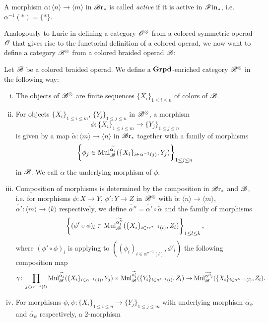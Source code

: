 \begin{defin}
    A morphism $\alpha \colon \langle n \rangle \to \langle m \rangle$ in $\mathscr{B} \text{r}_{\ast}$
    is called \emph{active} if it is active in $\mathscr{F} \text{in}_{\ast}$, i.e. $\alpha^{-1}(\ast) =
    \{\ast\}$.
\end{defin}

Analogously to Lurie in \cite{ha} defining a category $\mathscr{O}^{\otimes}$ from a colored
symmetric operad $\mathscr{O}$ that gives rise to the functorial definition of a colored
operad, we now want to define a category $\mathscr{B}^{\otimes}$ from a colored braided operad
$\mathscr{B}$:

\begin{defin}\label{def:B-tensor} Let $\mathscr{B}$ be a colored braided operad. We
    define a $\operatorname{\textbf{Grpd}}$-enriched category $\mathscr{B}^{\otimes}$ in the following way:
    \begin{enumerate}[(i)]
        \item The objects of $\mathscr{B}^{\otimes}$ are finite sequences $\{X_i\}_{1 \leq i \leq
        n}$ of colors of $\mathscr{B}$.
        \item For objects $\{X_i\}_{1 \leq i \leq m}$, $\{Y_j\}_{1 \leq j \leq
        n}$ in $\mathscr{B}^{\otimes}$, a morphism 
        \[
            \phi \colon \{X_i\}_{1 \leq i \leq m} \to \{Y_j\}_{1 \leq j \leq n}
        \]
        is given by a map $\widetilde{\alpha} \colon \langle m \rangle \to
        \langle n \rangle$ in $\mathscr{B} \text{r}_{\ast}$ together with a family of morphisms
        \[
            \left\{ \phi_j \in \operatorname{Mul}_{\mathscr{B}}^{\widetilde{\alpha_j}}(\{X_i\}_{i \in \alpha^{-1}(j)}, Y_j)\right\}_{1 \leq j \leq n}
        \]
        in $\mathscr{B}$. We call $\widetilde{\alpha}$ the underlying morphism of $\phi$.
        \item Composition of morphisms is determined by the composition in
        $\mathscr{B} \text{r}_{\ast}$ and $\mathscr{B}$, i.e. for morphisms $\phi \colon X \to Y$, $\phi' \colon
        Y \to Z$ in $\mathscr{B}^{\otimes}$  with $\widetilde{\alpha} \colon \langle n \rangle \to
        \langle m \rangle$, $\widetilde{\alpha'} \colon \langle m \rangle \to
        \langle k \rangle$ respectively, we define $\widetilde{\alpha''} =
        \widetilde{\alpha'} \circ \widetilde{\alpha}$ and the family of
        morphisms
        \[
            \left\{(\phi' \circ \phi)_l \in  \operatorname{Mul}_{\mathscr{B}}^{\widetilde{\alpha''_l}}(\{X_i\}_{i \in \alpha''^{-1}(l)}, Z_l)\right\}_{1 \leq l \leq k},
        \]
        where $(\phi' \circ \phi)_l$ is applying to $((\phi_i)_{i \in
        \alpha''^{-1}(l)}, \phi'_l)$ the following composition map 
        \[
            \gamma \colon \prod_{j \in \alpha'^{-1}(l)} \operatorname{Mul}_{\mathscr{B}}^{\widetilde{\alpha_j}}(\{X_i\}_{i \in \alpha^{-1}(j)},Y_j) \times \operatorname{Mul}_{\mathscr{B}}^{\widetilde{\alpha'_l}}(\{Y_i\}_{i \in \alpha'^{-1}(l)},Z_l) \to \operatorname{Mul}_{\mathscr{B}}^{\widetilde{\alpha''}_l}(\{X_i\}_{i \in \alpha''^{-1}(l)},Z_l).
        \] 
        \item For morphisms $\phi, \psi \colon \{X_i\}_{1 \leq i \leq n} \to
        \{Y_j\}_{1 \leq j \leq m}$ with underlying morphism
        $\widetilde{\alpha_{\phi}}$ and $\widetilde{\alpha_{\psi}}$
        respectively, a $2$-morphism 


\end{enumerate}
\end{defin}
